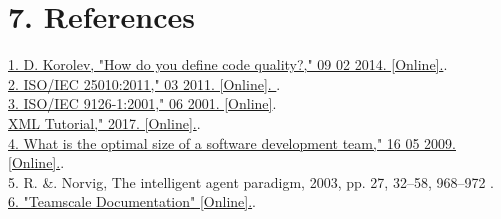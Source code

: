 \documentclass[letterpaper, 11pt]{report}
\begin{document}
\clearpage
{}
\section*{7. References}
 \href{https://www.quora.com/How-do-you-define-code-quality}{1. D. Korolev, "How do you define code quality?," 09 02 2014. [Online].}.\\
 \href{http://www.iso.org/iso/catalogue_detail.htm?csnumber=35733}{2. ISO/IEC 25010:2011," 03 2011. [Online]. }.\\
 \href{http://www.iso.org/iso/catalogue_detail.htm?csnumber=22749}{3. ISO/IEC 9126-1:2001," 06 2001. [Online]}.\\
 \href{http://www.w3schools.com/xml/}{XML Tutorial," 2017. [Online].}.\\
 \href{http://stackoverflow.com/questions/872103/what-is-the-optimal-size-of-a-software-develo}{4. What is the optimal size of a software development team," 16 05 2009. [Online].}.\\
 \normalsize{5. R. &. Norvig, The intelligent agent paradigm, 2003, pp. 27, 32–58, 968–972 .}\\
  \href{https://docs.teamscale.com/#why-teamscale-is-different.}{6. "Teamscale Documentation" [Online].}.\\
\end{document}
